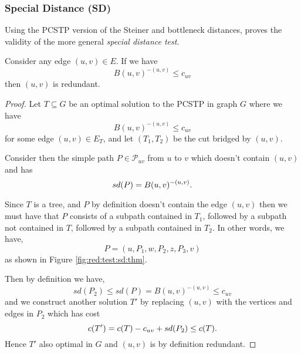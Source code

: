  \subsubsection{Special Distance (SD)}
 \label{sec:red:test:sd}
 Using the PCSTP version of the Steiner and bottleneck distances, \cite{uchoa2006reduction} proves
  the validity of the more general \textit{special distance test}.
 \begin{theorem}
 Consider any edge $(u,v) \in E$. If we have
 $$B(u,v)^{-(u,v)} \leq c_{uv}$$
 then $(u,v)$ is redundant.
\end{theorem}
 \begin{proof}
   Let $T  \subseteq G$ be an optimal solution to the PCSTP in graph $G$
   where we have
   $$B(u,v)^{-(u,v)} \leq c_{uv}$$
   for some edge $(u,v) \in E_T$, and let $(T_1, T_2)$ be the cut bridged
   by $(u,v)$.

   Consider then the simple path $P \in \mathcal{P}_{uv}$ from $u$ to $v$ which doesn't
    contain $(u,v)$ and has
   $$sd(P) = B(u,v)^{-(u,v)}\mathnormal{.}$$

   Since $T$ is a tree, and $P$ by definition doesn't contain the edge $(u,v)$
   then we must have that $P$ consists of a subpath contained in $T_1$, followed by
   a subpath not contained in $T$, followed by a subpath contained in $T_2$.
   In other words, we have,
   $$P = (u, P_1, w, P_2, z, P_3, v)$$
   as shown in Figure \ref{fig:red:test:sd:thm}.

   Then by definition we have,
   $$sd(P_2) \leq sd(P) = B(u,v)^{-(u,v)} \leq c_{uv}$$
   and we construct another solution $T'$ by replacing $(u,v)$ with the
   vertices and edges in $P_2$ which has cost
   $$c(T') = c(T) - c_{uv} + sd(P_2) \leq c(T)\mathnormal{.}$$
   Hence $T'$ also optimal in $G$ and $(u,v)$ is by definition redundant.
\end{proof}

